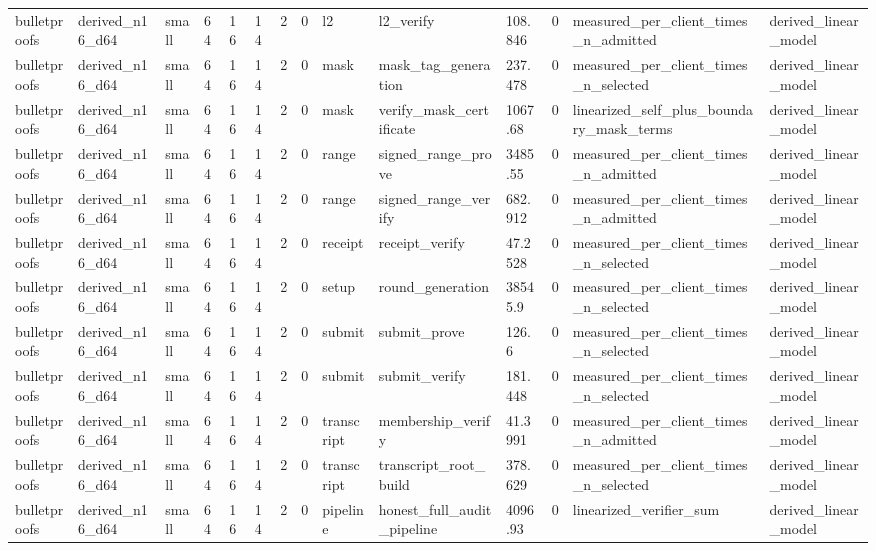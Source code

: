 \begin{table}[t]
\begin{tabular}{llllllllllllll}
bulletproofs & derived\_n16\_d64 & small & 64 & 16 & 14 & 2 & 0 & l2 & l2\_verify & 108.846 & 0 & measured\_per\_client\_times\_n\_admitted & derived\_linear\_model \\
bulletproofs & derived\_n16\_d64 & small & 64 & 16 & 14 & 2 & 0 & mask & mask\_tag\_generation & 237.478 & 0 & measured\_per\_client\_times\_n\_selected & derived\_linear\_model \\
bulletproofs & derived\_n16\_d64 & small & 64 & 16 & 14 & 2 & 0 & mask & verify\_mask\_certificate & 1067.68 & 0 & linearized\_self\_plus\_boundary\_mask\_terms & derived\_linear\_model \\
bulletproofs & derived\_n16\_d64 & small & 64 & 16 & 14 & 2 & 0 & range & signed\_range\_prove & 3485.55 & 0 & measured\_per\_client\_times\_n\_admitted & derived\_linear\_model \\
bulletproofs & derived\_n16\_d64 & small & 64 & 16 & 14 & 2 & 0 & range & signed\_range\_verify & 682.912 & 0 & measured\_per\_client\_times\_n\_admitted & derived\_linear\_model \\
bulletproofs & derived\_n16\_d64 & small & 64 & 16 & 14 & 2 & 0 & receipt & receipt\_verify & 47.2528 & 0 & measured\_per\_client\_times\_n\_selected & derived\_linear\_model \\
bulletproofs & derived\_n16\_d64 & small & 64 & 16 & 14 & 2 & 0 & setup & round\_generation & 38545.9 & 0 & measured\_per\_client\_times\_n\_selected & derived\_linear\_model \\
bulletproofs & derived\_n16\_d64 & small & 64 & 16 & 14 & 2 & 0 & submit & submit\_prove & 126.6 & 0 & measured\_per\_client\_times\_n\_selected & derived\_linear\_model \\
bulletproofs & derived\_n16\_d64 & small & 64 & 16 & 14 & 2 & 0 & submit & submit\_verify & 181.448 & 0 & measured\_per\_client\_times\_n\_selected & derived\_linear\_model \\
bulletproofs & derived\_n16\_d64 & small & 64 & 16 & 14 & 2 & 0 & transcript & membership\_verify & 41.3991 & 0 & measured\_per\_client\_times\_n\_admitted & derived\_linear\_model \\
bulletproofs & derived\_n16\_d64 & small & 64 & 16 & 14 & 2 & 0 & transcript & transcript\_root\_build & 378.629 & 0 & measured\_per\_client\_times\_n\_selected & derived\_linear\_model \\
bulletproofs & derived\_n16\_d64 & small & 64 & 16 & 14 & 2 & 0 & pipeline & honest\_full\_audit\_pipeline & 4096.93 & 0 & linearized\_verifier\_sum & derived\_linear\_model \\

\end{tabular}
\end{table}

